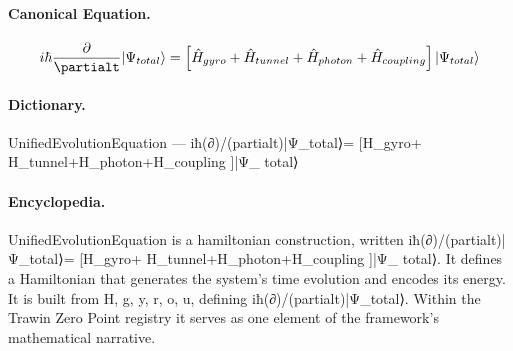 \paragraph{Canonical Equation.}
\[
i\hbar\frac{\partial}{\partialt}|\Psi_{total}\rangle=\left[\hat{H}_{gyro}+ \hat{H}_{tunnel}+\hat{H}_{photon}+\hat{H}_{coupling}\right]|\Psi_{ total}\rangle
\]

\paragraph{Dictionary.}
UnifiedEvolutionEquation — iħ(∂)/(partialt)|Ψ\_total⟩= [H\_gyro+ H\_tunnel+H\_photon+H\_coupling ]|Ψ\_ total⟩

\paragraph{Encyclopedia.}
UnifiedEvolutionEquation is a hamiltonian construction, written iħ(∂)/(partialt)|Ψ\_total⟩= [H\_gyro+ H\_tunnel+H\_photon+H\_coupling ]|Ψ\_ total⟩. It defines a Hamiltonian that generates the system's time evolution and encodes its energy. It is built from H, g, y, r, o, u, defining iħ(∂)/(partialt)|Ψ\_total⟩. Within the Trawin Zero Point registry it serves as one element of the framework's mathematical narrative.
